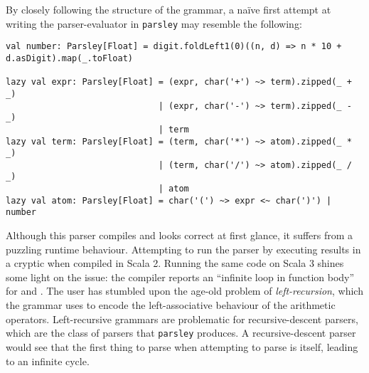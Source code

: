\documentclass[../../main.tex]{subfiles}
\begin{document}
%
By closely following the structure of the grammar, a naïve first attempt at writing the parser-evaluator in \texttt{parsley} may resemble the following:
\begin{verbatim}
val number: Parsley[Float] = digit.foldLeft1(0)((n, d) => n * 10 + d.asDigit).map(_.toFloat)

lazy val expr: Parsley[Float] = (expr, char('+') ~> term).zipped(_ + _)
                              | (expr, char('-') ~> term).zipped(_ - _)
                              | term
lazy val term: Parsley[Float] = (term, char('*') ~> atom).zipped(_ * _)
                              | (term, char('/') ~> atom).zipped(_ / _)
                              | atom
lazy val atom: Parsley[Float] = char('(') ~> expr <~ char(')') | number
\end{verbatim}
%
Although this parser compiles and looks correct at first glance, it suffers from a puzzling runtime behaviour.
Attempting to run the parser by executing  results in a cryptic  when compiled in Scala 2.
Running the same code on Scala 3 shines some light on the issue: the compiler reports an ``infinite loop in function body'' for  and .
The user has stumbled upon the age-old problem of \emph{left-recursion}, which the grammar uses to encode the left-associative behaviour of the arithmetic operators.
Left-recursive grammars are problematic for recursive-descent parsers, which are the class of parsers that \texttt{parsley} produces.
A recursive-descent parser would see that the first thing to parse when attempting to parse  is  itself, leading to an infinite cycle.
\end{document}
